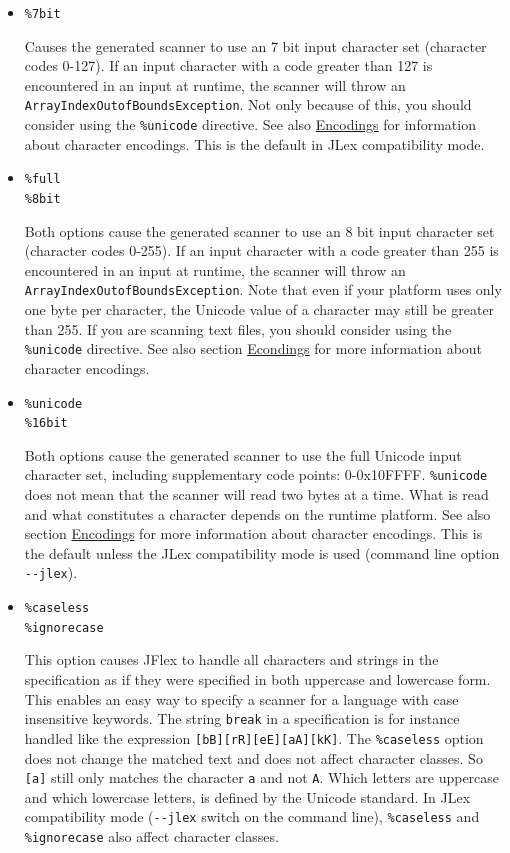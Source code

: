 \begin{itemize}
\item
  \texttt{\%7bit}

  Causes the generated scanner to use an 7 bit input character set
  (character codes 0-127). If an input character with a code greater
  than 127 is encountered in an input at runtime, the scanner will throw
  an \texttt{ArrayIndexOutofBoundsException}. Not only because of this,
  you should consider using the \texttt{\%unicode} directive. See also
  \hyperref[sec:encodings]{Encodings} for information about character
  encodings. This is the default in JLex compatibility mode.
\item
  \texttt{\%full}\\\texttt{\%8bit}

  Both options cause the generated scanner to use an 8 bit input
  character set (character codes 0-255). If an input character with a
  code greater than 255 is encountered in an input at runtime, the
  scanner will throw an \texttt{ArrayIndexOutofBoundsException}. Note
  that even if your platform uses only one byte per character, the
  Unicode value of a character may still be greater than 255. If you are
  scanning text files, you should consider using the \texttt{\%unicode}
  directive. See also section \hyperref[sec:encodings]{Econdings} for
  more information about character encodings.
\item
  \texttt{\%unicode}\\\texttt{\%16bit}

  Both options cause the generated scanner to use the full Unicode input
  character set, including supplementary code points: 0-0x10FFFF.
  \texttt{\%unicode} does not mean that the scanner will read two bytes
  at a time. What is read and what constitutes a character depends on
  the runtime platform. See also section
  \hyperref[sec:encodings]{Encodings} for more information about
  character encodings. This is the default unless the JLex compatibility
  mode is used (command line option \texttt{-\/-jlex}).
\item
  \texttt{\%caseless}\\\texttt{\%ignorecase}

  This option causes JFlex to handle all characters and strings in the
  specification as if they were specified in both uppercase and
  lowercase form. This enables an easy way to specify a scanner for a
  language with case insensitive keywords. The string \texttt{break} in
  a specification is for instance handled like the expression
  \texttt{{[}bB{]}{[}rR{]}{[}eE{]}{[}aA{]}{[}kK{]}}. The
  \texttt{\%caseless} option does not change the matched text and does
  not affect character classes. So \texttt{{[}a{]}} still only matches
  the character \texttt{a} and not \texttt{A}. Which letters are
  uppercase and which lowercase letters, is defined by the Unicode
  standard. In JLex compatibility mode (\texttt{-\/-jlex} switch on the
  command line), \texttt{\%caseless} and \texttt{\%ignorecase} also
  affect character classes.
\end{itemize}

